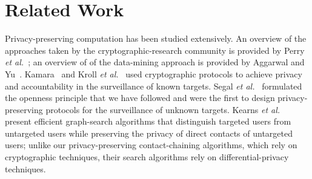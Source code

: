 \section{Related Work}\label{sec-related}
Privacy-preserving computation has been studied extensively. An overview
of the approaches taken by the cryptographic-research community is provided by
Perry {\it et al.}~\cite{pgfw-scn2014}; an overview of of the data-mining
approach is provided by Aggarwal and Yu~\cite{ay2008}.  Kamara~\cite{kamara}
and Kroll {\it et al.}~\cite{kroll} used cryptographic protocols to 
achieve privacy and accountability in the surveillance of known targets.
Segal {\it et al.}~\cite{sff-foci2014} formulated the openness principle that
we have followed and were the first to design privacy-preserving protocols for
the surveillance of unknown targets.  Kearns {\it et al.}~\cite{krwy-pnas16}
present efficient graph-search algorithms that distinguish targeted users from
untargeted users while preserving the privacy of direct contacts of untargeted
users; unlike our privacy-preserving contact-chaining algorithms, which rely
on cryptographic techniques, their search algorithms rely on 
differential-privacy techniques.
